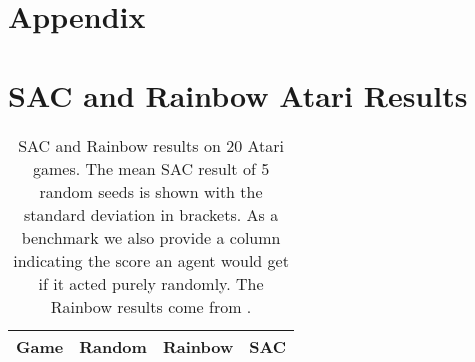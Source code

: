 \documentclass{article}
\begin{document}
\printbibliography
\clearpage

\section*{Appendix}
\appendix

\section{SAC and Rainbow Atari Results}
\label{sac_results}

\begin{table}[h]
\centering

\bgroup
\def\arraystretch{1.1}\caption{SAC and Rainbow results on 20 Atari games. The mean SAC result of 5 random seeds is shown with the standard deviation in brackets. As a benchmark we also provide a column indicating the score an agent would get if it acted purely randomly. The Rainbow results come from \cite{model-Atari}.}

\begin{tabular}{|c|c|c|c|}
\hline
\textbf{Game}  & \textbf{Random} & \textbf{Rainbow} & \textbf{SAC}     \\ \hline


\end{tabular}
\end{table}
\end{document}
